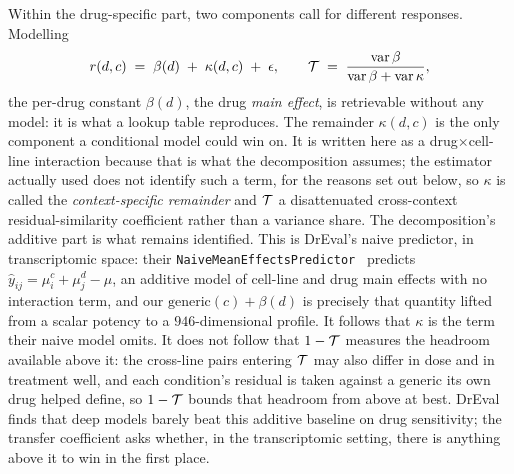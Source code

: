 Within the drug-specific part, two components call for different responses. Modelling
\begin{equation}
 r(d,c) \;=\; \beta(d) \;+\; \kappa(d,c) \;+\; \epsilon,
 \qquad
 \mathcal{T} \;=\; \frac{\operatorname{var}\beta}{\operatorname{var}\beta + \operatorname{var}\kappa},
\end{equation}
the per-drug constant $\beta(d)$, the drug \emph{main effect}, is retrievable without any
model: it is what a lookup table reproduces. The remainder $\kappa(d,c)$ is the only component a
conditional model could win on. It is written here as a drug$\times$cell-line interaction because
that is what the decomposition assumes; the estimator actually used does not identify such a term,
for the reasons set out below, so $\kappa$ is called the \emph{context-specific remainder} and
$\mathcal{T}$ a disattenuated cross-context residual-similarity coefficient rather than a variance
share. The decomposition's additive part is what remains identified. This is DrEval's naive predictor, in
transcriptomic space: their \texttt{NaiveMeanEffectsPredictor}~\cite{dreval} predicts
$\hat{y}_{ij} = \mu^c_i + \mu^d_j - \mu$, an additive model of cell-line and drug main effects with
no interaction term, and our $\textrm{generic}(c) + \beta(d)$ is precisely that quantity lifted from
a scalar potency to a $946$-dimensional profile. It follows that $\kappa$ is the term their naive
model omits. It does not follow that $1 - \mathcal{T}$ measures the headroom available above it: the
cross-line pairs entering $\mathcal{T}$ may also differ in dose and in treatment well, and each
condition's residual is taken against a generic its own drug helped define, so $1 - \mathcal{T}$ bounds
that headroom from above at best. DrEval finds
that deep models barely beat this additive baseline on drug sensitivity; the transfer coefficient
asks whether, in the transcriptomic setting, there is anything above it to win in the first place.

